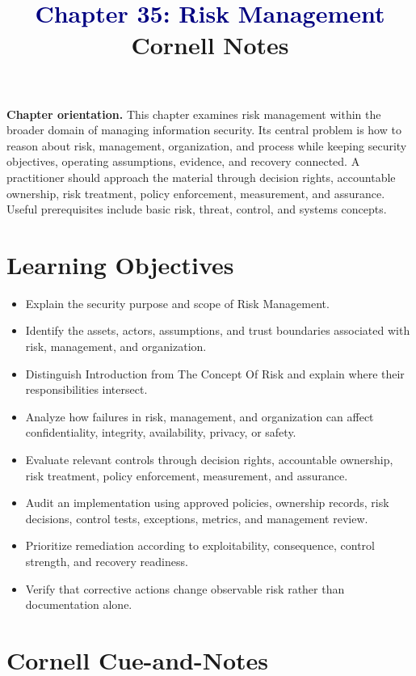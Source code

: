 \documentclass[11pt]{article}
\title{\textcolor{Navy}{Chapter 35: Risk Management}\\[2mm]\large Cornell Notes}
\author{}
\date{}
\begin{document}
\maketitle
\thispagestyle{fancy}
\vspace{-1.5em}
\begin{orientationbox}
\textbf{Chapter orientation.} This chapter examines risk management within the broader domain of managing information security. Its central problem is how to reason about risk, management, organization, and process while keeping security objectives, operating assumptions, evidence, and recovery connected. A practitioner should approach the material through decision rights, accountable ownership, risk treatment, policy enforcement, measurement, and assurance. Useful prerequisites include basic risk, threat, control, and systems concepts.
\end{orientationbox}
\section*{Learning Objectives}
\begin{itemize}
\item Explain the security purpose and scope of Risk Management.
\item Identify the assets, actors, assumptions, and trust boundaries associated with risk, management, and organization.
\item Distinguish Introduction from The Concept Of Risk and explain where their responsibilities intersect.
\item Analyze how failures in risk, management, and organization can affect confidentiality, integrity, availability, privacy, or safety.
\item Evaluate relevant controls through decision rights, accountable ownership, risk treatment, policy enforcement, measurement, and assurance.
\item Audit an implementation using approved policies, ownership records, risk decisions, control tests, exceptions, metrics, and management review.
\item Prioritize remediation according to exploitability, consequence, control strength, and recovery readiness.
\item Verify that corrective actions change observable risk rather than documentation alone.
\end{itemize}
\section*{Cornell Cue-and-Notes}
\end{document}
